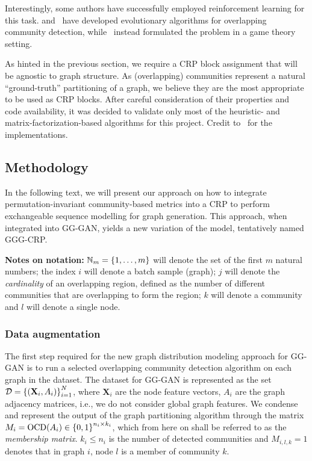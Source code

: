 Interestingly, some authors have successfully employed reinforcement learning for this task.
\cite{zhang_mixed_2017} and~\cite{bello-orgaz_multi-objective_2018} have developed evolutionary algorithms for overlapping community detection, while~\cite{wang_effective_2021} instead formulated the problem in a game theory setting. 

As hinted in the previous section, we require a CRP block assignment that will be agnostic to graph structure. As (overlapping) communities represent a natural \enquote{ground-truth} partitioning of a graph, we believe they are the most appropriate to be used as CRP blocks. After careful consideration of their properties and code availability, it was decided to validate only most of the heuristic- and matrix-factorization-based algorithms for this project. Credit to~\cite{csardi_igraph_2006, rozemberczki_karate_2020, li_local_2018, janchevski_dnmf-python_2022} for the implementations.

\subsection{Methodology}
\label{sec:methodology_gggcrp}

In the following text, we will present our approach on how to integrate permutation-invariant community-based metrics into a CRP to perform exchangeable sequence modelling for graph generation. This approach, when integrated into GG-GAN, yields a new variation of the model, tentatively named GGG-CRP. 

\textbf{Notes on notation:} $\mathbb{N}_{m} = \mathopen{}\left\{1,\dots,m\right\}$ will denote the set of the first $m$ natural numbers; the index $i$ will denote a batch sample (graph); $j$ will denote the \emph{cardinality} of an overlapping region, defined as the number of different communities that are overlapping to form the region; $k$ will denote a community and $l$ will denote a single node.

\subsubsection{Data augmentation}
The first step required for the new graph distribution modeling approach for GG-GAN is to run a selected overlapping community detection algorithm on each graph in the dataset. The dataset for GG-GAN is represented as the set $\mathcal{D} = \mathopen{}\left\{\mathopen{}\left(\mathbf{X}_i, A_i\right)\right\}_{i=1}^{N}$, where $\mathbf{X}_i$ are the node feature vectors, $A_i$ are the graph adjacency matrices, i.e., we do not consider global graph features. We condense and represent the output of the graph partitioning algorithm through the matrix $M_i = \text{OCD}\mathopen{}\left(A_i\right) \in \mathopen{}\left\{0, 1\right\}^{n_i \times k_i}$, which from here on shall be referred to as the \emph{membership matrix}. $k_i \leq n_i$ is the number of detected communities and $M_{i,l,k}=1$ denotes that in graph $i$, node $l$ is a member of community $k$.


